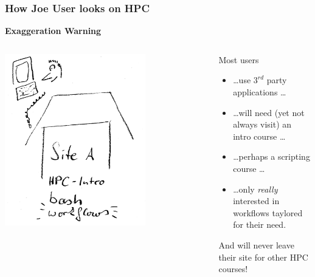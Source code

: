 \begin{frame}
  \frametitle{How Joe User looks on HPC}
  \centering
  {\bcattention \bf \large Exaggeration Warning \bcattention}
  \begin{columns}
    \begin{column}{.5\textwidth}
     \centering
     \includegraphics[width=0.7\textwidth]{images/joe}
    \end{column}
    \begin{column}{.5\textwidth}
      \pause
      Most users
      \begin{itemize}[<+->]
        \item \ldots use $3^{rd}$ party applications \ldots
        \item \ldots will need (yet not always visit) an intro course \ldots
        \item \ldots perhaps a scripting course \ldots
        \item \ldots only \emph{really} interested in workflows taylored for their need.
      \end{itemize}
      \pause
      And will never leave their site for other HPC courses!
    \end{column}
  \end{columns}
\end{frame}

